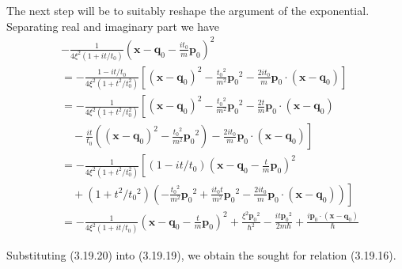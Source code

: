 \documentclass{article}
\begin{document}
The next step will be to suitably reshape the argument of the exponential.
Separating real and imaginary part we have
$$
\begin{align*}
&- \frac{1}{4 \xi^{2}\left(1+i t / t_{0}\right)}\left(\boldsymbol{x}-\boldsymbol{q}_{0}-\frac{i t_{0}}{m} \boldsymbol{p}_{0}\right)^{2}  \tag{3.19.20}\\
&=-\frac{1-i t / t_{0}}{4 \xi^{2}\left(1+t^{2} / t_{0}^{2}\right)}\left[\left(\boldsymbol{x}-\boldsymbol{q}_{0}\right)^{2}-\frac{t_{0}{ }^{2}}{m^{2}} \boldsymbol{p}_{0}{ }^{2}-\frac{2 i t_{0}}{m} \boldsymbol{p}_{0} \cdot\left(\boldsymbol{x}-\boldsymbol{q}_{0}\right)\right] \\
&=-\frac{1}{4 \xi^{2}\left(1+t^{2} / t_{0}^{2}\right)}\left[\left(\boldsymbol{x}-\boldsymbol{q}_{0}\right)^{2}-\frac{t_{0}{ }^{2}}{m^{2}} \boldsymbol{p}_{0}{ }^{2}-\frac{2 t}{m} \boldsymbol{p}_{0} \cdot\left(\boldsymbol{x}-\boldsymbol{q}_{0}\right)\right. \\
&\left.\quad-\frac{i t}{t_{0}}\left(\left(\boldsymbol{x}-\boldsymbol{q}_{0}\right)^{2}-\frac{t_{0}{ }^{2}}{m^{2}} \boldsymbol{p}_{0}{ }^{2}\right)-\frac{2 i t_{0}}{m} \boldsymbol{p}_{0} \cdot\left(\boldsymbol{x}-\boldsymbol{q}_{0}\right)\right] \\
&=-\frac{1}{4 \xi^{2}\left(1+t^{2} / t_{0}^{2}\right)}\left[\left(1-i t / t_{0}\right)\left(\boldsymbol{x}-\boldsymbol{q}_{0}-\frac{t}{m} \boldsymbol{p}_{0}\right)^{2}\right. \\
&\left.\quad+\left(1+t^{2} / t_{0}{ }^{2}\right)\left(-\frac{t_{0}{ }^{2}}{m^{2}} \boldsymbol{p}_{0}{ }^{2}+\frac{i t_{0} t}{m^{2}} \boldsymbol{p}_{0}{ }^{2}-\frac{2 i t_{0}}{m} \boldsymbol{p}_{0} \cdot\left(\boldsymbol{x}-\boldsymbol{q}_{0}\right)\right)\right] \\
&=-\frac{1}{4 \xi^{2}\left(1+i t / t_{0}\right)}\left(\boldsymbol{x}-\boldsymbol{q}_{0}-\frac{t}{m} \boldsymbol{p}_{0}\right)^{2}+\frac{\xi^{2} \boldsymbol{p}_{0}{ }^{2}}{\hbar^{2}}-\frac{i t \boldsymbol{p}_{0}{ }^{2}}{2 m \hbar}+\frac{i \boldsymbol{p}_{0} \cdot\left(\boldsymbol{x}-\boldsymbol{q}_{0}\right)}{\hbar}
\end{align*}
$$

Substituting (3.19.20) into (3.19.19), we obtain the sought for relation (3.19.16).
\end{document}
